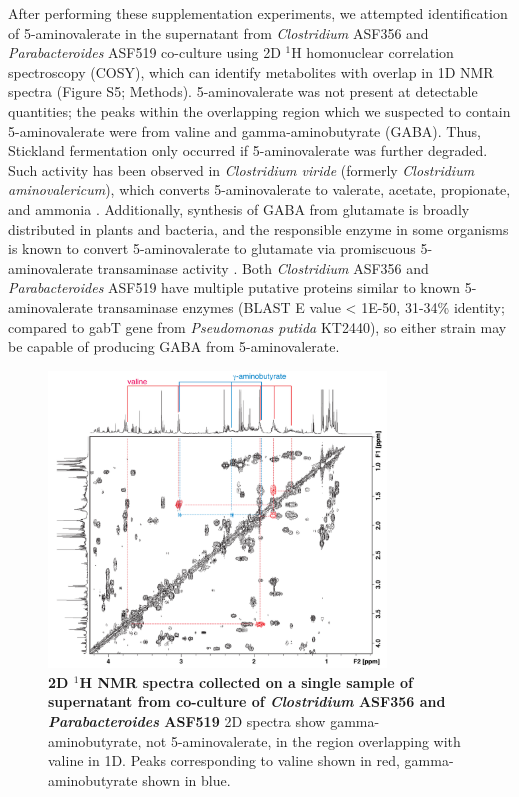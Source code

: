 \documentclass[11pt,twocolumn,notitlepage,openany,twoside]{book}
\begin{document}
\begin{refsection}
After performing these supplementation experiments, we attempted identification of 5-aminovalerate in the supernatant from \textit{Clostridium} ASF356 and \textit{Parabacteroides} ASF519 co-culture using 2D $^1\!$H homonuclear correlation spectroscopy (COSY), which can identify metabolites with overlap in 1D NMR spectra (Figure S5; Methods). 5-aminovalerate was not present at detectable quantities; the peaks within the overlapping region which we suspected to contain 5-aminovalerate were from valine and gamma-aminobutyrate (GABA). Thus, Stickland fermentation only occurred if 5-aminovalerate was further degraded. Such activity has been observed in \textit{Clostridium viride} (formerly \textit{Clostridium aminovalericum}), which converts 5-aminovalerate to valerate, acetate, propionate, and ammonia \cite{Barker1985-rs,Barker1987-jt}. Additionally, synthesis of GABA from glutamate is broadly distributed in plants and bacteria, and the responsible enzyme in some organisms is known to convert 5-aminovalerate to glutamate via promiscuous 5-aminovalerate transaminase activity \cite{Shin2016-vy,Yonaha1985-xp}. Both \textit{Clostridium} ASF356 and \textit{Parabacteroides} ASF519 have multiple putative proteins similar to known 5-aminovalerate transaminase enzymes (BLAST E value < 1E-50, 31-34\% identity; compared to gabT gene from \textit{Pseudomonas putida} KT2440), so either strain may be capable of producing GABA from 5-aminovalerate.

\begin{figure}[tb]
\centering
\includegraphics[width=0.8\textwidth]{ch2_figS5}
\caption[2D $^1\!$H NMR spectra collected on a single sample of supernatant from co-culture of \textit{Clostridium} ASF356 and \textit{Parabacteroides} ASF519]{\textbf{2D $^1\!$H NMR spectra collected on a single sample of supernatant from co-culture of \textit{Clostridium} ASF356 and \textit{Parabacteroides} ASF519} 2D spectra show gamma-aminobutyrate, not 5-aminovalerate, in the region overlapping with valine in 1D. Peaks corresponding to valine shown in red, gamma-aminobutyrate shown in blue.}
\end{figure}


\end{refsection}
\end{document}
